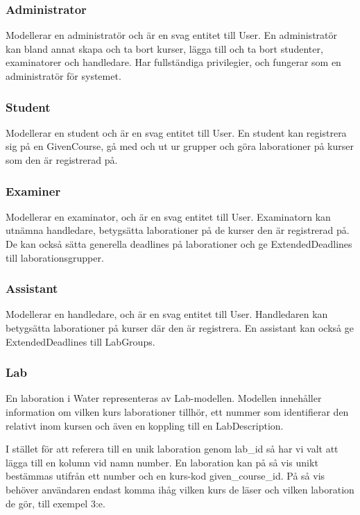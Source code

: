 \subsubsection{Administrator}
Modellerar en administratör och är en svag entitet till User. En administratör kan bland annat skapa och ta bort kurser, lägga till och ta bort studenter, examinatorer och handledare. Har fullständiga privilegier, och fungerar som en administratör för systemet.

\subsubsection{Student}
Modellerar en student och är en svag entitet till User. En student kan registrera sig på en GivenCourse, gå med och ut ur grupper och göra laborationer på kurser som den är registrerad på. 

\subsubsection{Examiner}
Modellerar en examinator, och är en svag entitet till User. Examinatorn kan utnämna handledare, betygsätta laborationer på de kurser den är registrerad på. De kan också sätta generella deadlines på laborationer och ge ExtendedDeadlines till laborationsgrupper.  

\subsubsection{Assistant}
Modellerar en handledare, och är en svag entitet till User. Handledaren kan betygsätta laborationer på kurser där den är registrera. En assistant kan också ge ExtendedDeadlines till LabGroups. 

\subsubsection{Lab}
En laboration i Water representeras av Lab-modellen. Modellen innehåller information om vilken kurs laborationer tillhör, ett nummer som identifierar den relativt inom kursen och även en koppling till en LabDescription.

I stället för att referera till en unik laboration genom lab\_id så har vi valt att lägga till en kolumn vid namn number. En laboration kan på så vis unikt bestämmas utifrån ett number och en kurs-kod given\_course\_id. På så vis behöver användaren endast komma ihåg vilken kurs de läser och vilken laboration de gör, till exempel 3:e.

